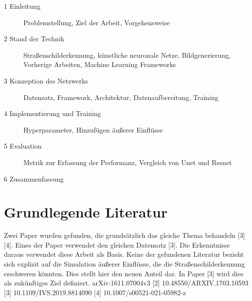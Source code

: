 \documentclass{scrartcl}
\begin{document}
\begin{description}
	\item[1 Einleitung] Problemstellung, Ziel der Arbeit, Vorgehensweise
	\item[2 Stand der Technik] Straßenschilderkennung, künstliche neuronale Netze, Bildgenerierung, Vorherige Arbeiten, Machine Learning Frameworks
	\item[3 Konzeption des Netzwerks] Datensatz, Framework, Architektur, Datenaufbereitung, Training
	\item[4 Implementierung und Training] Hyperparameter, Hinzufügen äußerer Einflüsse
	\item[5 Evaluation] Metrik zur Erfassung der Performanz, Vergleich von Unet und Resnet
	\item[6 Zusammenfassung]
	
\end{description}

\section{Grundlegende Literatur}
Zwei Paper wurden gefunden, die grundsätzlich das gleiche Thema behandeln [3][4]. Eines der Paper verwendet den gleichen Datensatz [3]. Die Erkenntnisse daraus verwendet diese Arbeit als Basis. Keine der gefundenen Literatur bezieht sich explizit auf die Simulation äußerer Einflüsse, die die Straßenschilderkennung erschweren könnten. Dies stellt hier den neuen Anteil dar. In Paper [3] wird dies als zukünftiges Ziel definiert.
\newline\newline [1] arXiv:1611.07004v3 [2] 10.48550/ARXIV.1703.10593 [3] 10.1109/IVS.2019.8814090 [4] 10.1007/s00521-021-05982-z
\end{document}
